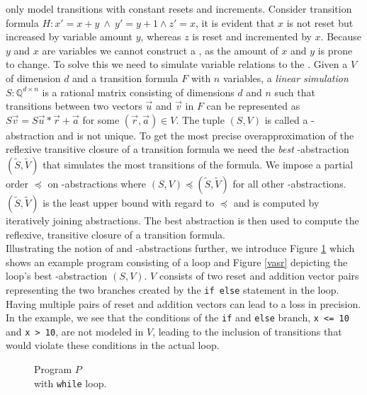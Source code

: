 \qvasr only model transitions with constant resets and increments. Consider transition formula $H: x' = x + y\ \land\ y' = y + 1 \land z' = x$, it is evident that $x$ is not reset but increased by variable amount $y$, whereas $z$ is reset and incremented by $x$. Because $y$ and $x$ are variables we cannot construct a \qvasr, as the amount of $x$ and $y$ is prone to change. To solve this we need to simulate variable relations to the \qvasr. Given a \qvasr $V$ of dimension $d$ and a transition formula $F$ with $n$ variables, a \textsl{linear simulation} $S: \mathbb{Q}^{d \times n} $ is a rational matrix consisting of dimensions $d$ and $n$ such that transitions between two vectors $\vec{u}$ and $\vec{v}$ in $F$ can be represented as $S\vec{v} = S\vec{u} * \vec{r} + \vec{a}$ for some $(\vec{r}, \vec{a}) \in V$. The tuple $(S, V)$ is called a \qvasr-abstraction and is not unique. To get the most precise overapproximation of the reflexive transitive closure of a transition formula we need the \textsl{best} \qvasr-abstraction $(\tilde{S}, \tilde{V})$ that simulates the most transitions of the formula. We impose a partial order $\preceq$ on \qvasr-abstractions where $(S, V) \preceq (\tilde{S}, \tilde{V})$ for all other \qvasr-abstractions. $(\tilde{S}, \tilde{V})$ is the least upper bound with regard to $\preceq$ and is computed by iteratively joining abstractions. The best abstraction is then used to compute the reflexive, transitive closure of a transition formula. \\ Illustrating the notion of \qvasr and \qvasr-abstractions further, we introduce Figure \ref{code} which shows an example program consisting of a loop and Figure \ref{vasr} depicting the loop's best \qvasr-abstraction $(S,V)$. $V$ consists of two reset and addition vector pairs representing the two branches created by the \texttt{if else} statement in the loop. Having multiple pairs of reset and addition vectors can lead to a loss in precision. In the example, we see that the conditions of the \texttt{if} and \texttt{else} branch, \texttt{x <= 10} and \texttt{x > 10}, are not modeled in $V$, leading to the inclusion of transitions that would violate these conditions in the actual loop. \\
\begin{minipage}[t]{0.3\linewidth} \centering
	\begin{figure}[H]
		
		\caption{Program $P$ \\ with \texttt{while} loop.}
		\label{code}
	\end{figure}
\end{minipage}
